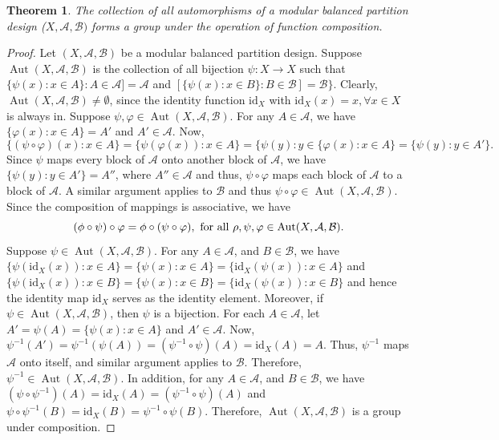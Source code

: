 \documentclass[preprint,11pt]{elsarticle}
\newtheorem{theorem}{Theorem}[section]
\begin{document}
 
\begin{theorem}
    The collection of all automorphisms of a modular balanced partition design ($X,\mathcal{A},\mathcal{B})$ forms a group under the operation of function composition.
\end{theorem}
\begin{proof}
Let $(X, \mathcal{A}, \mathcal{B})$ be a modular balanced partition design. Suppose $
\operatorname{Aut}(X,\mathcal{A},\mathcal{B})$ is the collection of all bijection 
$\psi:X \to X$ such that $\{\psi(x):x\in A\}:A\in\mathcal{A}]=\mathcal{A}$ and $
[\{\psi(x):x\in B\}:B\in\mathcal{B}]=\mathcal{B}\}$. Clearly, $\operatorname{Aut}(X,\mathcal{A},\mathcal{B})\ne \emptyset$, since the identity function $\mathrm{id}_{X}$ with $\mathrm{id}_{X}(x)=x,\forall x\in X$ is always in. Suppose $\psi, \varphi \in \operatorname{Aut}(X, \mathcal{A}, \mathcal{B})$. 
For any $A \in \mathcal{A}$, we have $\{\varphi(x) : x \in A\}=A'$ and $A'\in \mathcal{A}$. Now,  
\[
 \{(\psi\circ \varphi)(x) : x \in A\}=\{\psi(\varphi(x)) : x \in A\} = \{\psi(y) : y \in \{\varphi(x) : x \in A\}=\{\psi(y) : y \in A'\}.
\]
Since $\psi$ maps every block of $\mathcal{A}$ onto another block of $\mathcal{A}$, we have $\{\psi(y) : y \in A'\}=A''$, where $A''\in \mathcal{A}$ and thus, $\psi \circ \varphi$ maps each block of $\mathcal{A}$ to a block of $\mathcal{A}$. 
A similar argument applies to $\mathcal{B}$ and thus $\psi \circ \varphi \in \operatorname{Aut}(X, \mathcal{A}, \mathcal{B})$.  
Since the composition of mappings is associative, we have
\[
(\phi \circ \psi) \circ \varphi = \phi \circ (\psi \circ \varphi), \textnormal{~for~all~} \rho, \psi, \varphi \in \operatorname{Aut}(X, \mathcal{A}, \mathcal{B}).
\] Suppose $\psi \in \operatorname{Aut}(X, \mathcal{A}, \mathcal{B})$. For any $A \in \mathcal{A}$,
 and $B \in \mathcal{B}$,
 we have
$\{\psi(\mathrm{id}_{X}(x)) : x \in A\} = \{\psi(x) : x \in A\} = \{\mathrm{id}_{X}(\psi(x)) : x \in A\}$  and  $
\{\psi(\mathrm{id}_{X}(x)) : x \in B\} = \{\psi(x) : x \in B\} = \{\mathrm{id}_{X}(\psi(x)) : x \in B\}$ and hence the identity map $\mathrm{id}_{X}$ serves as the identity element. Moreover, if $\psi \in \operatorname{Aut}(X, \mathcal{A}, \mathcal{B})$, then $\psi$ is a bijection. 
For each $A \in \mathcal{A}$, let $A' =\psi(A)= \{\psi(x):x \in A\}$ and $A'\in \mathcal{A}$. Now, $\psi^{-1}(A') = \psi^{-1}(\psi(A)) = (\psi^{-1}\circ \psi)(A) = \mathrm{id}_X(A)  = A$. 
Thus, $\psi^{-1}$ maps $\mathcal{A}$ onto itself, and  similar argument applies to $\mathcal{B}$. 
Therefore, $\psi^{-1} \in \operatorname{Aut}(X, \mathcal{A}, \mathcal{B})$. In addition, for any $A\in \mathcal{A}$, and $B\in \mathcal{B}$, we have 
 $(\psi\circ \psi^{-1})(A)=\mathrm{id}_X(A)=(\psi^{-1}\circ \psi)(A)$ and $\psi\circ \psi^{-1}(B)=\mathrm{id}_X(B)=\psi^{-1}\circ \psi(B)$.
\noindent Therefore, $\operatorname{Aut}(X, \mathcal{A}, \mathcal{B})$ is a group under composition. 
\end{proof}
  
\end{document}

